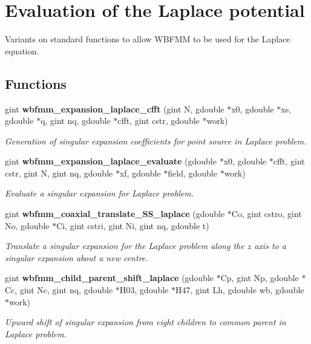 \section{Evaluation of the Laplace potential}
\label{group__laplace}


Variants on standard functions to allow W\+B\+F\+M\+M to be used for the Laplace equation.  


\subsection*{Functions}
\begin{DoxyCompactItemize}
\item 
gint {\bf wbfmm\+\_\+expansion\+\_\+laplace\+\_\+cfft} (gint N, gdouble $\ast$x0, gdouble $\ast$xs, gdouble $\ast$q, gint nq, gdouble $\ast$cfft, gint cstr, gdouble $\ast$work)
\begin{DoxyCompactList}\small\item\em Generation of singular expansion coefficients for point source in Laplace problem. \end{DoxyCompactList}\item 
gint {\bf wbfmm\+\_\+expansion\+\_\+laplace\+\_\+evaluate} (gdouble $\ast$x0, gdouble $\ast$cfft, gint cstr, gint N, gint nq, gdouble $\ast$xf, gdouble $\ast$field, gdouble $\ast$work)
\begin{DoxyCompactList}\small\item\em Evaluate a singular expansion for Laplace problem. \end{DoxyCompactList}\item 
gint {\bf wbfmm\+\_\+coaxial\+\_\+translate\+\_\+\+S\+S\+\_\+laplace} (gdouble $\ast$Co, gint cstro, gint No, gdouble $\ast$Ci, gint cstri, gint Ni, gint nq, gdouble t)
\begin{DoxyCompactList}\small\item\em Translate a singular expansion for the Laplace problem along the $z$ axis to a singular expansion about a new centre. \end{DoxyCompactList}\item 
gint {\bf wbfmm\+\_\+child\+\_\+parent\+\_\+shift\+\_\+laplace} (gdouble $\ast$Cp, gint Np, gdouble $\ast$Cc, gint Nc, gint nq, gdouble $\ast$H03, gdouble $\ast$H47, gint Lh, gdouble wb, gdouble $\ast$work)
\begin{DoxyCompactList}\small\item\em Upward shift of singular expansion from eight children to common parent in Laplace problem. \end{DoxyCompactList}\item 

\end{DoxyCompactItemize}
